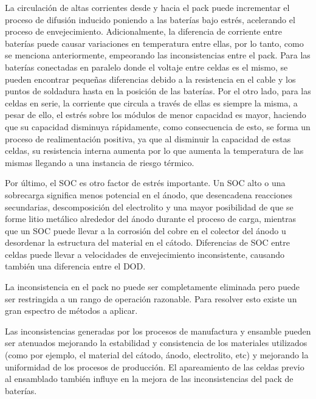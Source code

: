 \documentclass[10pt,a4paper]{article}
\newcounter{subsubsubsection}[subsubsection]
\begin{document}
La circulaci\'on de altas corrientes desde y hacia el pack puede incrementar el
proceso de difusi\'on inducido poniendo a las bater\'ias bajo estr\'es, 
acelerando el proceso de envejecimiento. Adicionalmente, la diferencia
de corriente entre bater\'ias puede causar variaciones en temperatura entre
ellas, por lo tanto, como se menciona anteriormente, empeorando las
inconsistencias entre el pack. Para las bater\'ias conectadas en paralelo donde
el voltaje entre celdas es el mismo, se pueden encontrar pequeñas diferencias
debido a la resistencia en el cable y los puntos de soldadura hasta en la
posici\'on de las bater\'ias. Por el otro lado, para las celdas en serie, la
corriente que circula a trav\'es de ellas es siempre la misma, a pesar de ello,
el estr\'es sobre los m\'odulos de menor capacidad es mayor, haciendo que su
capacidad disminuya r\'apidamente, como consecuencia de esto, se forma un
proceso de realimentaci\'on positiva, ya que al disminuir la capacidad de estas
celdas, su resistencia interna aumenta por lo que aumenta la temperatura de las
mismas llegando a una instancia de riesgo t\'ermico.

Por \'ultimo, el \acrshort{SOC} es otro factor de estr\'es importante. Un
\acrshort{SOC} alto o una sobrecarga significa menos potencial en el \'anodo,
que desencadena reacciones secundarias, descomposici\'on del electrolito y una
mayor posibilidad de que se forme litio met\'alico alrededor del \'anodo 
durante el proceso de carga, mientras que un \acrshort{SOC} puede llevar a la 
corrosi\'on del cobre en el colector del \'anodo u desordenar la estructura del 
material en el c\'atodo. Diferencias de \acrshort{SOC} entre celdas puede llevar 
a velocidades de envejecimiento inconsistente, causando tambi\'en una diferencia 
entre el \acrshort{DOD}.


La inconsistencia en el pack no puede ser completamente eliminada pero puede ser
restringida a un rango de operaci\'on razonable. Para resolver esto existe un gran
espectro de m\'etodos a aplicar.

Las inconsistencias generadas por los procesos de manufactura y ensamble pueden
ser atenuados mejorando la estabilidad y consistencia de los materiales
utilizados (como por ejemplo, el material del c\'atodo, \'anodo, electrolito,
etc) y mejorando la uniformidad de los procesos de producci\'on. El apareamiento
de las celdas previo al ensamblado tambi\'en influye en la mejora de las
inconsistencias del pack de bater\'ias.
\end{document}
